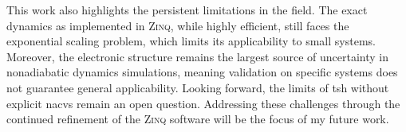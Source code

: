 This work also highlights the persistent limitations in the field. The exact dynamics as implemented in \textsc{Zinq}, while highly efficient, still faces the exponential scaling problem, which limits its applicability to small systems. Moreover, the electronic structure remains the largest source of uncertainty in nonadiabatic dynamics simulations, meaning validation on specific systems does not guarantee general applicability. Looking forward, the limits of \gls{tsh} without explicit \glspl{nacv} remain an open question. Addressing these challenges through the continued refinement of the \textsc{Zinq} software will be the focus of my future work.
